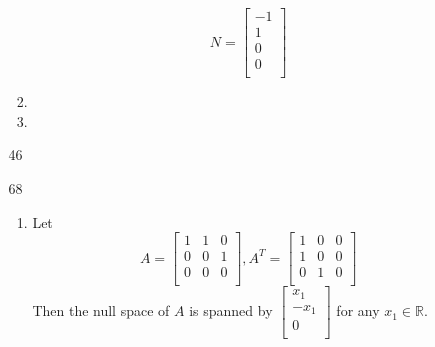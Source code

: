 \documentclass[12pt,letterpaper]{article}
\begin{document}
\begin{enumerate}[label=\S 2.\arabic*]
\begin{enumerate}
\begin{enumerate}[label=Step \arabic*]
              \[
                N
                =
                \begin{bmatrix}
                  -1 \\
                   1 \\
                   0 \\
                   0 \\
                \end{bmatrix}
              \]
            \item
            \item
          \end{enumerate}
        \item [46]
        \item [68]
          \begin{enumerate}
            \item
              Let
              \[
                A
                =
                \begin{bmatrix}
                  1 & 1 & 0 \\
                  0 & 0 & 1 \\
                  0 & 0 & 0 \\
                \end{bmatrix}
                ,
                A^T
                =
                \begin{bmatrix}
                  1 & 0 & 0 \\
                  1 & 0 & 0 \\
                  0 & 1 & 0 \\
                \end{bmatrix}
              \]
              Then the null space of $A$ is spanned by
              $\begin{bmatrix}x_1 \\ -x_1 \\ 0 \\\end{bmatrix}$
              for any $x_1 \in \mathbb{R}$.


\end{enumerate}
\end{enumerate}
\end{enumerate}
\end{document}
